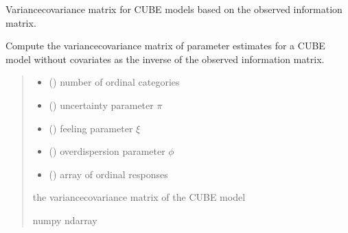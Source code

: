 \documentclass[letterpaper,10pt,english]{sphinxmanual}
\begin{document}
\begin{fulllineitems}
\label{\detokenize{cubmods:cubmods.cube.varcov}}
\pysigstartsignatures
{}
\pysigstopsignatures
\sphinxAtStartPar
Variance\sphinxhyphen{}covariance matrix for CUBE models based on the observed information matrix.

\sphinxAtStartPar
Compute the variance\sphinxhyphen{}covariance matrix of parameter estimates for a CUBE model without covariates 
as the inverse of the observed information matrix.
\begin{quote}\begin{description}
\begin{itemize}
\item {} 
\sphinxAtStartPar
{} () \textendash{} number of ordinal categories

\item {} 
\sphinxAtStartPar
{} () \textendash{} uncertainty parameter \(\pi\)

\item {} 
\sphinxAtStartPar
{} () \textendash{} feeling parameter \(\xi\)

\item {} 
\sphinxAtStartPar
{} () \textendash{} overdispersion parameter \(\phi\)

\item {} 
\sphinxAtStartPar
{} () \textendash{} array of ordinal responses

\end{itemize}

\sphinxAtStartPar
the variance\sphinxhyphen{}covariance matrix of the CUBE model

\sphinxAtStartPar
numpy ndarray

\end{description}\end{quote}

\end{fulllineitems}
\end{document}
